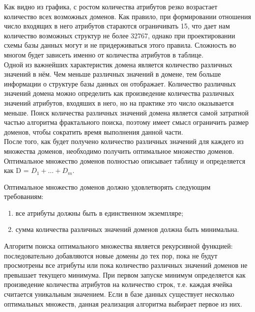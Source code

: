 Как видно из графика, с ростом количества атрибутов резко возрастает количество всех возможных доменов. Как правило, при формировании отношения число входящих в него атрибутов стараются ограничивать 15, что дает нам количество возможных структур не более 32767, однако при проектировании схемы базы данных могут и не придерживаться этого правила. Сложность во многом будет зависеть именно от количества атрибутов в таблице.
\\

Одной из важнейших характеристик домена является количество различных значений в нём. Чем меньше различных значений в домене, тем больше информации о структуре базы данных он отображает. Количество различных значений домена можно определить как произведение количества различных значений атрибутов, входяших в него, но на практике это число оказывается меньше. Поиск количества различных значений домена является самой затратной частью алгоритма фрактального поиска, поэтому имеет смысл ограничить размер доменов, чтобы сократить время выполнения данной части. 
\\

После того, как будет получено количество различных значений для каждего из множества доменов, необходимо получить оптимальное множество доменов. Оптимальное множество доменов полностью описывает таблицу и определяется как D = $D_1 + \dots + D_m$.

Оптимальное множество доменов должно удовлетворять следующим требованиям: 
\begin{enumerate}
\item все атрибуты должны быть в единственном экземпляре;
\item  сумма количества различных значений доменов должна быть минимальна.
\end{enumerate}

Алгоритм поиска оптимального множества является рекурсивной функцией: последовательно добавляются новые домены до тех пор, пока не будут просмотрены все атрибуты или пока количество различных значений доменов не превышает текущего минимума. При первом запуске минимум определяется как произведение количества атрибутов на количество строк, т.е. каждая ячейка считается уникальным значением. Если в базе данных существует несколько оптимальных множеств, данная реализация алгоритма выбирает первое из них.

\pagebreak
